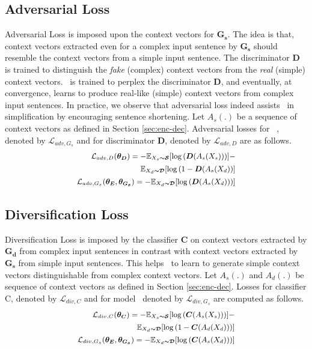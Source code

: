 \documentclass[11pt,a4paper]{article}
\begin{document}
\subsection{Adversarial Loss} 
\label{sec:advloss}
Adversarial Loss is imposed upon the context vectors for $\boldsymbol{G_s}$. The idea is that, context vectors extracted even for a complex input sentence by $\boldsymbol{G_s}$ should resemble the context vectors from a simple input sentence. The discriminator $\boldsymbol{D}$ is trained to distinguish the \textit{fake} (complex) context vectors from the \textit{real} (simple) context vectors. \simplf\ is trained to perplex the discriminator $\boldsymbol{D}$, and eventually, at convergence, learns to produce real-like (simple) context vectors from complex input sentences. In practice, we observe that adversarial loss indeed assists \simplf\ in simplification by encouraging sentence shortening. Let $A_s(.)$ be a sequence of context vectors as defined in Section \ref{sec:enc-dec}. Adversarial losses for \simplf\ , denoted by $\mathcal{L}_{adv,G_s}$ and for discriminator $\boldsymbol{D}$, denoted by $\mathcal{L}_{adv,D}$ are as follows.
\begin{align}
\small
\mathcal{L}_{adv,D}(\boldsymbol{\theta_{D}}) = -\mathbb{E}_{X_s\boldsymbol{ \sim  \mathcal{S}}}[\log{(\boldsymbol{D}(A_s (X_s)))}] - \nonumber\\ 
\small
\mathbb{E}_{X_d\boldsymbol{ \sim  \mathcal{D}}}[\log{(1- \boldsymbol{D}(A_s (X_d))}] \\
\small
\mathcal{L}_{adv,G_s}(\boldsymbol{\theta_E},\boldsymbol{\theta_{G_s}}) = -\mathbb{E}_{X_d\boldsymbol{ \sim  \mathcal{D}}}[\log{(\boldsymbol{D}(A_s(X_d)))}]
\label{eqn:advloss}
\end{align}
\subsection{Diversification Loss}
\label{sec:clfloss}
Diversification Loss is imposed by the classifier $\boldsymbol{C}$ on context vectors extracted by $\boldsymbol{G_d}$ from complex input sentences in contrast with context vectors extracted by $\boldsymbol{G_s}$ from simple input sentences. This helps \simplf\ to learn to generate simple context vectors distinguishable from complex context vectors. Let $A_s(.)$ and $A_d(.)$ be sequence of context vectors as defined in Section \ref{sec:enc-dec}. Losses for classifier C, denoted by $\mathcal{L}_{div,C}$ and for model \simplf\, denoted by $\mathcal{L}_{div,G_s}$ are computed as follows.
\begin{align}
\small
\mathcal{L}_{div,C}(\boldsymbol{\theta_{C}}) = -\mathbb{E}_{X_s\boldsymbol{ \sim  \mathcal{S}}}[\log{(\boldsymbol{C}(A_s(X_s)))}] - \nonumber \\
\small
\mathbb{E}_{X_d\boldsymbol{ \sim  \mathcal{D}}}[\log{(1-\boldsymbol{C}(A_d(X_d)))}]\\
\small
\mathcal{L}_{div,G_s}(\boldsymbol{\theta_E},\boldsymbol{\theta_{G_s}}) = -\mathbb{E}_{X_d\boldsymbol{ \sim  \mathcal{D}}}[\log{(\boldsymbol{C}(A_s(X_d)))}] 
\label{eqn:clfloss}
\end{align}
\end{document}
